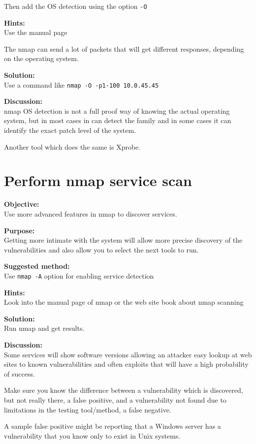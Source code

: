 \documentclass[a4paper,11pt,notitlepage]{report}
\begin{document}
Then add the OS detection using the option \verb+-O+

{\bf Hints:} \\
Use the manual page

The nmap can send a lot of packets that will get different responses, depending on the operating system.

{\bf Solution:}\\
Use a command like \verb+nmap -O -p1-100 10.0.45.45+


{\bf Discussion:}\\
nmap OS detection is not a full proof way of knowing the actual operating system, but in most cases in can detect the family and in some cases it can identify the exact patch level of the system.

Another tool which does the same is Xprobe.

\chapter{Perform nmap service scan}
\label{ex:nmap-service}

{\bf Objective:} \\
Use more advanced features in nmap to discover services.

{\bf Purpose:}\\
Getting more intimate with the system will allow more precise discovery of the vulnerabilities and also allow you to select the next tools to run.

{\bf Suggested method:}\\
Use \verb+nmap -A+ option for enabling service detection

{\bf Hints:} \\
Look into the manual page of nmap or the web site book about nmap scanning

{\bf Solution:}\\
Run nmap and get results.

{\bf Discussion:}\\

Some services will show software versions allowing an attacker easy lookup at web sites to known vulnerabilities and often exploits that will have a high probability of success.

Make sure you know the difference between a vulnerability which is discovered, but not really there, a false positive, and a vulnerability not found due to limitations in the testing tool/method, a false negative.

A sample false positive might be reporting that a Windows server has a vulnerability that you know only to exist in Unix systems.
\end{document}
